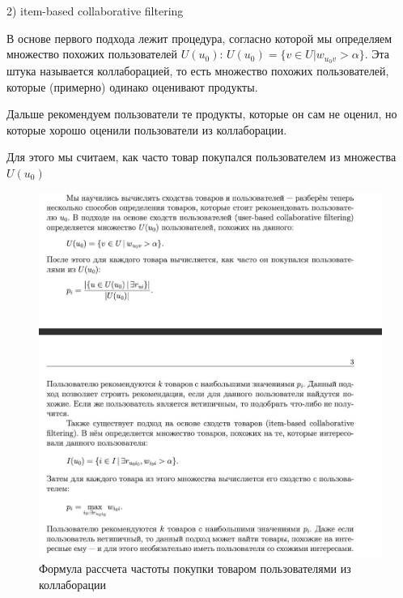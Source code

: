 	2) item-based collaborative filtering 
	
	В основе первого подхода лежит процедура, согласно которой мы определяем множество похожих пользователей $U(u_0)$: $U(u_0) = \{v \in U | w_{u_0 v} > \alpha\}$. Эта штука называется коллаборацией, то есть множество похожих пользователей, которые (примерно) одинако оценивают продукты. 
	
	Дальше рекомендуем пользователи те продукты, которые он сам не оценил, но которые хорошо оценили пользователи из коллаборации. 
	
	Для этого мы считаем, как часто товар покупался пользователем из множества $U(u_0) $
		

	
			\begin{figure}[H]
\centering
\includegraphics[width=0.7\linewidth]{16_memory2.jpg}
\caption{Формула рассчета частоты покупки товаром пользователями из коллаборации}
\label{fig:16_memory2} 
\end{figure}

